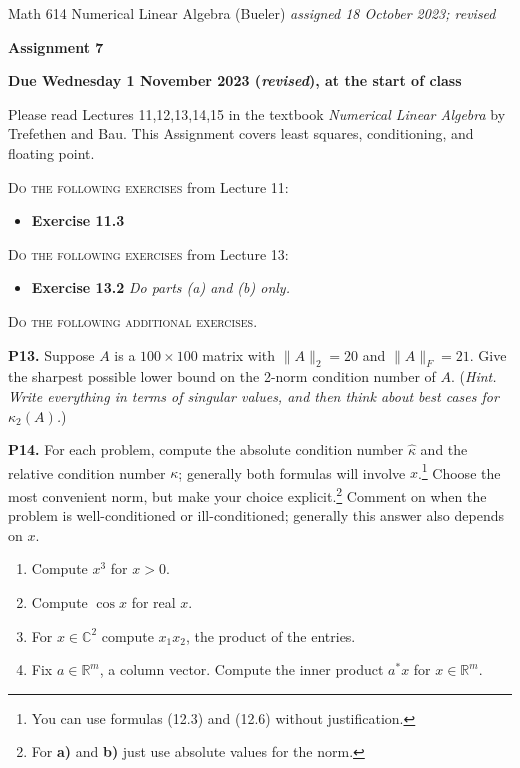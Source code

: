 \documentclass[12pt]{amsart}
\newcommand{\CC}{\mathbb{C}}
\newcommand{\RR}{\mathbb{R}}
\newcommand{\prob}[1]{\bigskip\noindent\textbf{#1.}\quad }
\begin{document}
\scriptsize \noindent Math 614 Numerical Linear Algebra (Bueler) \hfill \emph{assigned 18 October 2023; revised}
\normalsize\medskip

\Large\centerline{\textbf{Assignment 7}}
\large
\medskip

\centerline{\textbf{Due Wednesday 1 November 2023 (\emph{revised}), at the start of class}}
\medskip
\normalsize

\thispagestyle{empty}

\bigskip
\noindent Please read Lectures 11,12,13,14,15 in the textbook \emph{Numerical Linear Algebra} by Trefethen and Bau.  This Assignment covers least squares, conditioning, and floating point.

\bigskip
\noindent \textsc{Do the following exercises} from Lecture 11:

\begin{itemize}
\item \textbf{Exercise 11.3}
\end{itemize}

\bigskip
\noindent \textsc{Do the following exercises} from Lecture 13:

\begin{itemize}
\item \textbf{Exercise 13.2} \quad \emph{Do parts \emph{(a)} and \emph{(b)} only.}
\end{itemize}


\bigskip
\noindent \textsc{Do the following additional exercises.}

\medskip

\prob{P13}  Suppose $A$ is a $100\times 100$ matrix with $\|A\|_2=20$ and $\|A\|_F=21$.  Give the sharpest possible lower bound on the 2-norm condition number of $A$.  (\emph{Hint.  Write everything in terms of singular values, and then think about best cases for $\kappa_2(A)$.})


\prob{P14}  For each problem, compute the absolute condition number $\hat\kappa$ and the relative condition number $\kappa$; generally both formulas will involve $x$.\footnote{You can use formulas (12.3) and (12.6) without justification.}  Choose the most convenient norm, but make your choice explicit.\footnote{For \textbf{a)} and \textbf{b)} just use absolute values for the norm.}  Comment on when the problem is well-conditioned or ill-conditioned; generally this answer also depends on $x$.
\renewcommand{\labelenumi}{\textbf{\alph{enumi})}}
\begin{enumerate}
\item Compute $x^3$ for $x>0$.
\item Compute $\cos x$ for real $x$.
\item For $x\in\CC^2$ compute $x_1x_2$, the product of the entries.
\item Fix $a\in\RR^m$, a column vector.  Compute the inner product $a^*x$ for $x\in \RR^m$.
\end{enumerate}
\end{document}
